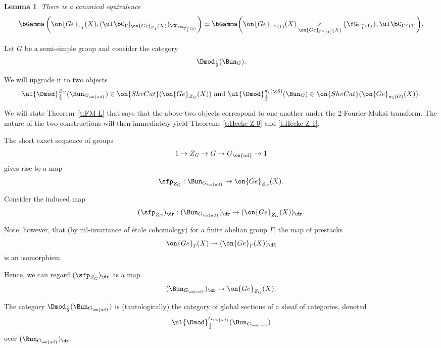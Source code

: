 \documentclass[9pt]{amsart}
\newtheorem{lem}[subsubsection]{Lemma}
\theoremstyle{remark}
\theoremstyle{definition}
\theoremstyle{remark}
\newcommand{\thmref}[1]{Theorem~\ref{#1}}
\numberwithin{equation}{section}
\begin{document}
\begin{lem} \label{l:sgrp}
There is a canonical equivalence
$$\bGamma\left(\on{Ge}_{\Gamma_1}(X), (\ul\bC_\Gamma|_{\on{Ge}_{\Gamma_1}(X)})_{\CG_{\fG_{\Gamma_1^\vee(1)}}}\right)
\simeq \bGamma\biggl(\on{Ge}_{\Gamma^\vee(1)}(X)\underset{\on{Ge}_{\Gamma_1^\vee(1)}(X)}\times \{\fG_{\Gamma_1^\vee(1)}\},\ul\bC_{\Gamma^\vee(1)}\biggr).$$
\end{lem}



Let $G$ be a semi-simple group and consider the category
$$\Dmod_{\frac{1}{2}}(\Bun_G).$$

We will upgrade it to two objects
$$\ul{\Dmod}^{Z_G}_{\frac{1}{2}}(\Bun_{G_{\on{ad}}})\in \on{ShvCat}(\on{Ge}_{Z_G}(X))
\text{ and }  \ul{\Dmod}^{\pi_1(\cG)}_{\frac{1}{2}}(\Bun_G)\in \on{ShvCat}(\on{Ge}_{\pi_1(G)}(X)).$$

We will state \thmref{t:FM L} that says that the above two objects correspond to one another under
the 2-Fourier-Mukai transform. The nature of the two constructions will 
then immediately yield Theorems \ref{t:Hecke Z 0} and \ref{t:Hecke Z 1}. 

\sssec{}

The short exact sequence of groups
$$1\to Z_G\to G \to G_{\on{ad}}\to 1$$
gives rise to a map
\begin{equation} 
\sfp_{Z_G}:\Bun_{G_{\on{ad}}}\to \on{Ge}_{Z_G}(X).
\end{equation}

Consider the induced map
$$(\sfp_{Z_G})_\dr:(\Bun_{G_{\on{ad}}})_\dr\to (\on{Ge}_{Z_G}(X))_\dr.$$

\sssec{}

Note, however, that (by nil-invariance of \'etale cohomology) for a finite abelian group $\Gamma$,  the map of prestacks 
$$\on{Ge}_{\Gamma}(X) \to (\on{Ge}_{\Gamma}(X))_{\dR}$$
is an isomorphism. 

\medskip

Hence, we can regard $(\sfp_{Z_G})_\dr$ as a map
\begin{equation} \label{e:to pi Ge}
(\Bun_{G_{\on{ad}}})_\dr\to \on{Ge}_{Z_G}(X).
\end{equation}

\sssec{}

The category $\Dmod_{\frac{1}{2}}(\Bun_{G_{\on{ad}}})$ is (tautologically) the category of global sections of a sheaf
of categories, denoted
$$\ul{\Dmod}^{G_{\on{ad}}}_{\frac{1}{2}}(\Bun_{G_{\on{ad}}})$$
over $(\Bun_{G_{\on{ad}}})_\dr$. 
\end{document}
